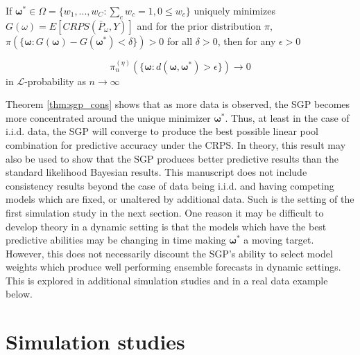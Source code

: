 \begin{theorem}
\label{thm:sgp_cons}
     
     If $\boldsymbol{\omega}^* \in \Omega = \{w_1, ..., w_C : 
     \sum_c w_c = 1, 0 \leq w_c \}$ uniquely minimizes $G(\omega) = 
     E[CRPS(\bar{P}_{\omega}, Y)]$ and for the prior distribution $\pi$, 
     $\pi(\{\boldsymbol{\omega} : G(\boldsymbol{\omega}) - 
     G(\boldsymbol{\omega}^*) < \delta\}) > 0$ 
     for all $\delta > 0$, then for any $\epsilon > 0$

     \[
        \pi_n^{(\eta)} (\{\boldsymbol{\omega} : 
        d(\boldsymbol{\omega}, \boldsymbol{\omega}^*) > \epsilon \} ) 
        \rightarrow 0
     \]
     in $\mathcal{L}$-probability as $n \rightarrow \infty$
\end{theorem}



Theorem \ref{thm:sgp_cons} shows that as more data is observed, 
the SGP becomes more
concentrated around the unique minimizer $\boldsymbol{\omega}^*$. Thus, at 
least in the case of i.i.d. data, the SGP will converge to produce the best
possible linear pool combination for predictive accuracy under the CRPS. 
In theory, this result may also be used to show that the SGP produces better 
predictive results than the standard likelihood Bayesian results.
This manuscript does not include consistency results beyond the case of data 
being i.i.d. and having competing models which are fixed, or unaltered by 
additional data. Such is the setting of the first simulation study in the 
next section. One reason it may be difficult to develop theory in a dynamic 
setting is that the models which have the best predictive abilities may be 
changing in time making $\boldsymbol{\omega^*}$ a 
moving target. However, this does not 
necessarily discount the SGP's ability to select model weights which produce 
well performing ensemble forecasts in dynamic settings. This is explored in 
additional simulation studies and in a real data example below.







\section{Simulation studies} \label{sec:simulation}

